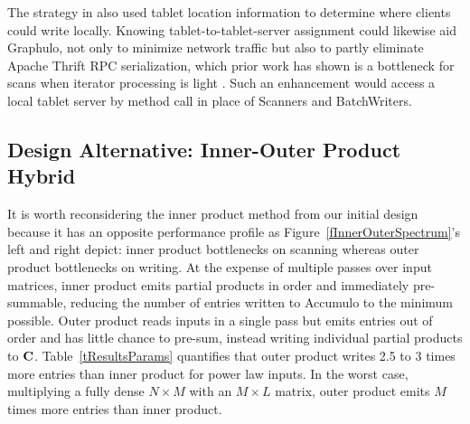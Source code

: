 The strategy in \cite{kepner2014achieving} 
also used %
tablet location information
to determine where clients could write locally.
Knowing tablet-to-tablet-server assignment could likewise aid Graphulo, 
not only to minimize network traffic
but also
 to partly eliminate Apache Thrift RPC serialization,
which prior work has shown is a bottleneck for scans %
when iterator processing is light \cite{sawyer2013understanding}.
Such an enhancement would access a local tablet server by method call 
in place of Scanners and BatchWriters.


\subsection{Design Alternative: Inner-Outer Product Hybrid}

It is worth reconsidering the inner product method from our initial design
because it has an opposite performance profile as 
Figure~\ref{fInnerOuterSpectrum}'s left and right depict: 
inner product bottlenecks on scanning whereas outer product bottlenecks on writing.
At the expense of multiple passes over input matrices, inner product emits 
partial products in order and immediately pre-summable,
reducing the number of entries written to Accumulo to the minimum possible.
Outer product reads inputs in a single pass
but emits entries out of order and has little chance to pre-sum, 
instead writing individual partial products to $\mathbf{C}$.
Table~\ref{tResultsParams} quantifies that outer product writes
2.5 to 3 times more entries than inner product for power law inputs.
In the worst case, multiplying a fully dense $N \times M$ with an $M \times L$ matrix,
outer product emits $M$ times more entries than inner product.



